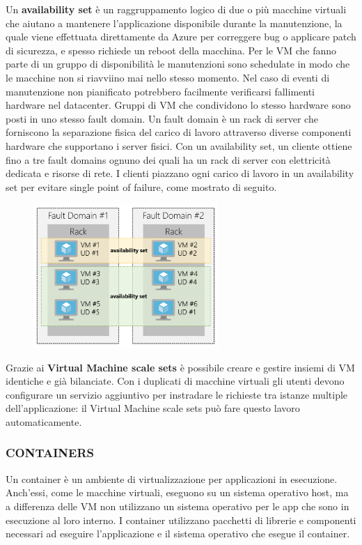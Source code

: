 Un \textbf{availability set} è un raggruppamento logico di due o più macchine virtuali che aiutano a mantenere l'applicazione disponibile durante la manutenzione, la quale viene effettuata direttamente da Azure per correggere bug o applicare patch di sicurezza, e spesso richiede un reboot della macchina. Per le VM che fanno parte di un gruppo di disponibilità le manutenzioni sono schedulate in modo che le macchine non si riavviino mai  nello stesso momento. Nel caso di eventi di manutenzione non pianificato potrebbero facilmente verificarsi fallimenti hardware nel datacenter. Gruppi di VM che condividono lo stesso hardware sono posti in uno stesso fault domain. Un fault domain è un rack di server che forniscono la separazione fisica del carico di lavoro attraverso diverse componenti hardware che supportano i server fisici. Con un availability set, un cliente ottiene fino a tre fault domains ognuno dei quali ha un rack di server con elettricità dedicata e risorse di rete. I clienti piazzano ogni carico di lavoro in un availability set per evitare single point of failure, come mostrato di seguito.

\begin{figure}[htb!]
    \centering
    \includegraphics[width=7cm]{./Images/cap14/14.3.png}
\end{figure}

Grazie ai \textbf{Virtual Machine scale sets} è possibile creare e gestire insiemi di VM identiche e già bilanciate. Con i duplicati di macchine virtuali gli utenti devono configurare un servizio aggiuntivo per instradare le richieste tra istanze multiple dell'applicazione: il Virtual Machine scale sets può fare questo lavoro automaticamente. 

\subsubsection{\textbf{CONTAINERS}}
Un container è un ambiente di virtualizzazione per applicazioni in esecuzione. Anch'essi, come le macchine virtuali, eseguono su un sistema operativo host, ma a differenza delle VM non utilizzano un sistema operativo per le app che sono in esecuzione al loro interno. I container utilizzano pacchetti di librerie e componenti necessari ad eseguire l'applicazione e il sistema operativo che esegue il container.

